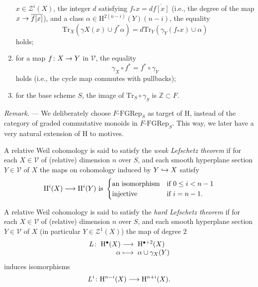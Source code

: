 \documentclass[a4paper,10pt]{article}
\newenvironment{remark}{\medskip\textit{Remark.} --- }{\medskip}
\def\basepieces{\mathscr{V}}
\newcommand{\fgrep}[2]{#1\textrm{-}\mathrm{FGRep}_{#2}}
\def\coh{\mathrm{H}}
\def\cyc{\mathscr{Z}}
\def\Tr{\mathrm{Tr}}
\begin{document}
\begin{enumerate}[label=(C\arabic*)]
		$x \in \cyc^{i}(X)$, the integer $d$ satisfying $f_{*}x =
		d\overline{f[x]}$ (i.e., the degree of the map
		$\map{x}{\overline{f[x]}}$), and a class $\alpha \in
		\coh^{2(n-i)}(Y)(n-i)$, the equality
		\[
			\Tr_{X}(\gamma{X}(x) \cup f^{*}\alpha) =
			d\Tr_{Y}(\gamma_{Y}(f_{*}x) \cup \alpha)
		\]
		holds;
	\item for a map $\map[f]{X}{Y}$ in $\basepieces$, the equality
		\[
			\gamma_{X} \circ f^{*} = f^{*} \circ \gamma_{Y}
		\]
		holds (i.e., the cycle map commutes with pullbacks);
	\item for the base scheme $S$, the image of $\Tr_{S} \circ \gamma_{S}$
		is $\mathbb{Z} \subset F$.
\end{enumerate} %

\begin{remark} %
	We deliberately choose $\fgrep{F}{S}$ as target of $\coh$, instead of
	the category of graded commutative monoids in $\fgrep{F}{S}$. This way,
	we later have a very natural extension of $\coh$ to motives.
\end{remark} %

A relative Weil cohomology is said to satisfy the \emph{weak Lefschetz theorem}
if for each $X \in \basepieces$ of (relative) dimension $n$ over $S$, and each
smooth hyperplane section $Y \in \basepieces$ of $X$ the maps on cohomology
induced by $\map{Y}[hook]{X}$ satisfy
\[
	\map{\coh^{i}(X)}{\coh^{i}(Y)} \text{ is }
	\begin{cases} %
		\text{an isomorphism} & \text{if } 0 \le i < n - 1 \\
		\text{injective} & \text{if } i = n - 1.
	\end{cases} %
\]

A relative Weil cohomology is said to satisfy the \emph{hard Lefschetz theorem}
if for each $X \in \basepieces$ of (relative) dimension $n$ over $S$, and each
smooth hyperplane section $Y \in \basepieces$ of $X$ (in particular $Y \in
\cyc^{1}(X)$) the map of degree $2$
\[
	\map[L]{\coh^{\bullet}(X)}{\coh^{\bullet+2}(X)}%
	[\alpha][\alpha \cup \gamma_{X}(Y)]
\]
induces isomorphisms
\[
	\map[L^{i}]{\coh^{n-i}(X)}{\coh^{n+i}(X)}.
\]
\end{document}
